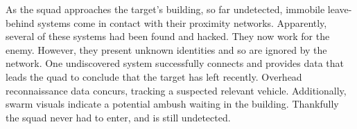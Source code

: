 As the squad approaches the target's building, so far undetected, immobile leave-behind systems come in contact with their proximity networks.
Apparently, several of these systems had been found and hacked.
They now work for the enemy.
However, they present unknown identities and so are ignored by the network.
One undiscovered system successfully connects and provides data that leads the quad to conclude that the target has left recently.
Overhead reconnaissance data concurs, tracking a suspected relevant vehicle.
Additionally, swarm visuals indicate a potential ambush waiting in the building.
Thankfully the squad never had to enter, and is still undetected.
